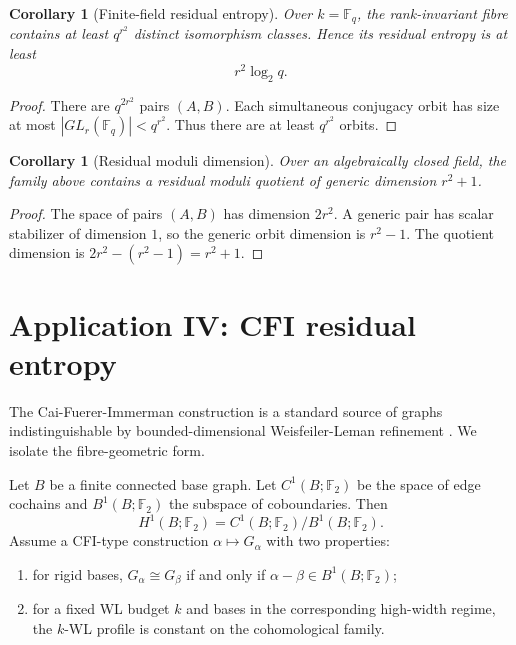 \documentclass[11pt]{article}
\newtheorem{corollary}[theorem]{Corollary}
\begin{document}
\begin{corollary}[Finite-field residual entropy]
Over \(k=\mathbb F_q\), the rank-invariant fibre contains at least \(q^{r^2}\) distinct isomorphism classes.  Hence its residual entropy is at least
\[
r^2\log_2q.
\]
\end{corollary}

\begin{proof}
There are \(q^{2r^2}\) pairs \((A,B)\).  Each simultaneous conjugacy orbit has size at most \(|GL_r(\mathbb F_q)|<q^{r^2}\).  Thus there are at least \(q^{r^2}\) orbits.
\end{proof}

\begin{corollary}[Residual moduli dimension]
Over an algebraically closed field, the family above contains a residual moduli quotient of generic dimension \(r^2+1\).
\end{corollary}

\begin{proof}
The space of pairs \((A,B)\) has dimension \(2r^2\).  A generic pair has scalar stabilizer of dimension \(1\), so the generic orbit dimension is \(r^2-1\).  The quotient dimension is \(2r^2-(r^2-1)=r^2+1\).
\end{proof}

\section{Application IV: CFI residual entropy}

The Cai-Fuerer-Immerman construction is a standard source of graphs indistinguishable by bounded-dimensional Weisfeiler-Leman refinement \cite{cfi}.  We isolate the fibre-geometric form.

Let \(B\) be a finite connected base graph.  Let \(C^1(B;\mathbb F_2)\) be the space of edge cochains and \(B^1(B;\mathbb F_2)\) the subspace of coboundaries.  Then
\[
H^1(B;\mathbb F_2)=C^1(B;\mathbb F_2)/B^1(B;\mathbb F_2).
\]
Assume a CFI-type construction \(\alpha\mapsto G_\alpha\) with two properties:
\begin{enumerate}[label=\textup{(\roman*)}]
\item for rigid bases, \(G_\alpha\cong G_\beta\) if and only if \(\alpha-\beta\in B^1(B;\mathbb F_2)\);
\item for a fixed WL budget \(k\) and bases in the corresponding high-width regime, the \(k\)-WL profile is constant on the cohomological family.
\end{enumerate}
\end{document}
